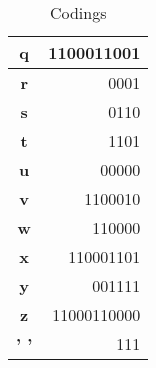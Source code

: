 \documentclass{article}
\begin{document}
\begin{table}[h]
\begin{tabular}{|c|r|}
            \textbf{q}                              & 1100011001                         \\ \hline
            \textbf{r}                              & 0001                               \\ \hline
            \textbf{s}                              & 0110                               \\ \hline
            \textbf{t}                              & 1101                               \\ \hline
            \textbf{u}                              & 00000                              \\ \hline
            \textbf{v}                              & 1100010                            \\ \hline
            \textbf{w}                              & 110000                             \\ \hline
            \textbf{x}                              & 110001101                          \\ \hline
            \textbf{y}                              & 001111                             \\ \hline
            \textbf{z}                              & 11000110000                        \\ \hline
            \textbf{' '}                            & 111                                \\ \hline
        \end{tabular}
        \caption{Codings}\label{codes}
    \end{table}

    \pagebreak
\end{document}
